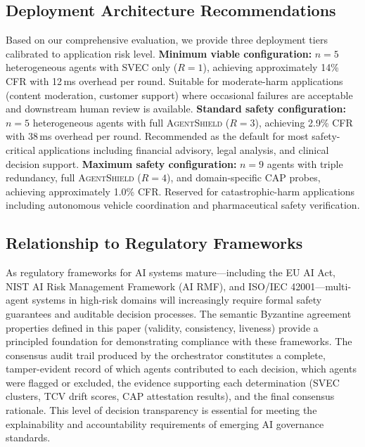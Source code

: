 \documentclass[journal,10pt]{IEEEtran}
\begin{document}
\subsection{Deployment Architecture Recommendations}
Based on our comprehensive evaluation, we provide three deployment tiers calibrated to application risk level. \textbf{Minimum viable configuration:} $n=5$ heterogeneous agents with SVEC only ($R=1$), achieving approximately 14\% CFR with 12\,ms overhead per round. Suitable for moderate-harm applications (content moderation, customer support) where occasional failures are acceptable and downstream human review is available. \textbf{Standard safety configuration:} $n=5$ heterogeneous agents with full \textsc{AgentShield} ($R=3$), achieving 2.9\% CFR with 38\,ms overhead per round. Recommended as the default for most safety-critical applications including financial advisory, legal analysis, and clinical decision support. \textbf{Maximum safety configuration:} $n=9$ agents with triple redundancy, full \textsc{AgentShield} ($R=4$), and domain-specific CAP probes, achieving approximately 1.0\% CFR. Reserved for catastrophic-harm applications including autonomous vehicle coordination and pharmaceutical safety verification.

\subsection{Relationship to Regulatory Frameworks}
As regulatory frameworks for AI systems mature---including the EU AI Act, NIST AI Risk Management Framework (AI RMF), and ISO/IEC 42001---multi-agent systems in high-risk domains will increasingly require formal safety guarantees and auditable decision processes. The semantic Byzantine agreement properties defined in this paper (validity, consistency, liveness) provide a principled foundation for demonstrating compliance with these frameworks. The consensus audit trail produced by the orchestrator constitutes a complete, tamper-evident record of which agents contributed to each decision, which agents were flagged or excluded, the evidence supporting each determination (SVEC clusters, TCV drift scores, CAP attestation results), and the final consensus rationale. This level of decision transparency is essential for meeting the explainability and accountability requirements of emerging AI governance standards.
\end{document}
